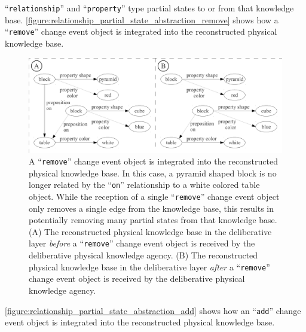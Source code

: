 ``{\tt{relationship}}'' and ``{\tt{property}}'' type partial states to
or from that knowledge base.
{\mbox{\autoref{figure:relationship_partial_state_abstraction_remove}}}
shows how a ``{\tt{remove}}'' change event object is integrated into
the reconstructed physical knowledge base.
\begin{figure}
\centering
\includegraphics[width=12cm]{gfx/relationship_partial_state_abstraction_remove}
\caption[A ``{\tt{remove}}'' change event object is integrated into
  the reconstructed physical knowledge base.]{A ``{\tt{remove}}''
  change event object is integrated into the reconstructed physical
  knowledge base.  In this case, a pyramid shaped block is no longer
  related by the ``{\tt{on}}'' relationship to a white colored table
  object.  While the reception of a single ``{\tt{remove}}'' change
  event object only removes a single edge from the knowledge base,
  this results in potentially removing many partial states from that
  knowledge base.  (A) The reconstructed physical knowledge base in
  the deliberative layer \emph{before} a ``{\tt{remove}}'' change
  event object is received by the deliberative physical knowledge
  agency.  (B) The reconstructed physical knowledge base in the
  deliberative layer \emph{after} a ``{\tt{remove}}'' change event
  object is received by the deliberative physical knowledge agency.}
\label{figure:relationship_partial_state_abstraction_remove}
\end{figure}
{\mbox{\autoref{figure:relationship_partial_state_abstraction_add}}}
shows how an ``{\tt{add}}'' change event object is integrated into the
reconstructed physical knowledge base.
